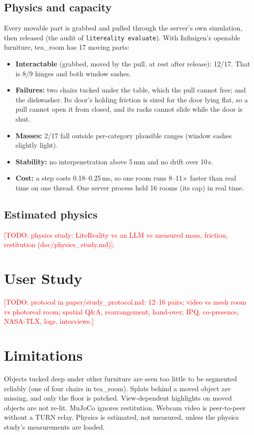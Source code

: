 \documentclass[sigconf,review,anonymous]{acmart}
\newcommand{\todo}[1]{\textcolor{red}{[TODO: #1]}}
\newcommand{\measured}[1]{#1}
\begin{document}
\subsection{Physics and capacity}
Every movable part is grabbed and pulled through the server's own simulation, then released
(the audit of \texttt{litereality evaluate}). With Infinigen's openable furniture, tea\_room has
17 moving parts:
\begin{itemize}
  \item \textbf{Interactable} (grabbed, moved by the pull, at rest after release):
        \measured{12/17}. That is \measured{8/9} hinges and both window sashes.
  \item \textbf{Failures:} two chairs tucked under the table, which the pull cannot free; and
        the dishwasher. Its door's holding friction is sized for the door lying flat, so a pull
        cannot open it from closed, and its racks cannot slide while the door is shut.
  \item \textbf{Masses:} \measured{2/17} fall outside per-category plausible ranges (window
        sashes slightly light).
  \item \textbf{Stability:} no interpenetration above 5\,mm and no drift over 10\,s.
  \item \textbf{Cost:} a step costs \measured{0.18--0.25\,ms}, so one room runs
        \measured{8--11$\times$} faster than real time on one thread. One server process held
        \measured{16} rooms (its cap) in real time.
\end{itemize}

\subsection{Estimated physics}
\todo{physics study: LiteReality vs an LLM vs measured mass, friction, restitution
(doc/physics\_study.md)}.

\section{User Study}
\todo{protocol in paper/study\_protocol.md: 12--16 pairs; video vs mesh room vs photoreal room;
spatial Q\&A, rearrangement, hand-over; IPQ, co-presence, NASA-TLX, logs, interviews.}

\section{Limitations}
Objects tucked deep under other furniture are seen too little to be segmented reliably (one of
four chairs in tea\_room). Splats behind a moved object are missing, and only the floor is
patched. View-dependent highlights on moved objects are not re-lit. MuJoCo ignores restitution.
Webcam video is peer-to-peer without a TURN relay. Physics is estimated, not measured, unless the
physics study's measurements are loaded.



\end{document}
